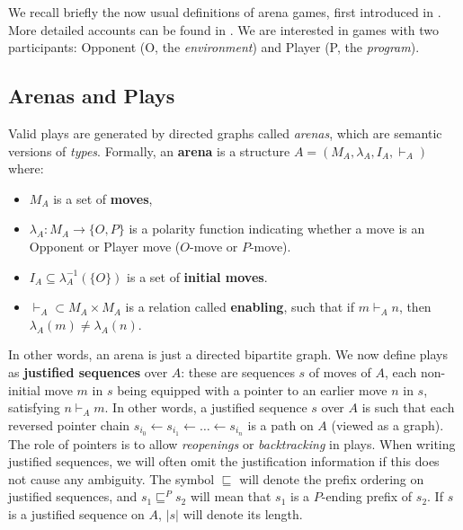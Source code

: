 \documentclass{article}
\newcommand{\from}{\leftarrow}
\begin{document}
We recall briefly the now usual definitions of arena games, first introduced in \cite{hyland-ong}. More detailed accounts
can be found in \cite{fpc2000,harmer2004innocent}. We are interested in games with two participants: Opponent
(O, the \emph{environment}) and Player (P, the \emph{program}). 


\subsection{Arenas and Plays}

Valid plays are generated by directed graphs called \emph{arenas}, which are semantic versions of \emph{types}. 
Formally, an \textbf{arena} is a structure $A=(M_A,\lambda_A,I_A,\vdash_{A})$ where:
\begin{itemize}
\item $M_{A}$ is a set of \textbf{moves},
\item $\lambda_{A}:M_{A} \to \{O,P\}$ is a polarity function indicating whether
a move is an Opponent or Player move ($O$-move or $P$-move).
\item $I_A\subseteq \lambda_A^{-1}(\{O\})$ is a set of \textbf{initial moves}.
\item $\vdash_{A} \subset M_{A}\times M_A$ is a relation called \textbf{enabling}, such that
if $m \vdash_A n$, then $\lambda_{A}(m)\neq \lambda_{A}(n)$.
\end{itemize}
In other words, an arena is just a directed bipartite graph. We now define plays as \textbf{justified sequences} over ${A}$: these are
sequences $s$ of moves of ${A}$, each non-initial move $m$ in $s$ being equipped with a pointer to an earlier move
$n$ in $s$, satisfying $n\vdash_{A} m$. In other words, a justified sequence $s$ over ${A}$ is such that
each reversed pointer chain $s_{i_0}\from s_{i_1} \from \dots \from s_{i_n}$ is a path on ${A}$ (viewed as a graph).
The role of pointers is to allow \emph{reopenings} or \emph{backtracking} in plays. When writing justified sequences, we will often omit the
justification information if this does not cause any ambiguity. The symbol $\sqsubseteq$ will denote the prefix ordering on justified
sequences, and $s_1 \sqsubseteq^P s_2$ will mean that $s_1$ is a $P$-ending prefix of $s_2$.
If $s$ is a justified sequence on ${A}$, $|s|$ will denote its length.
\end{document}
